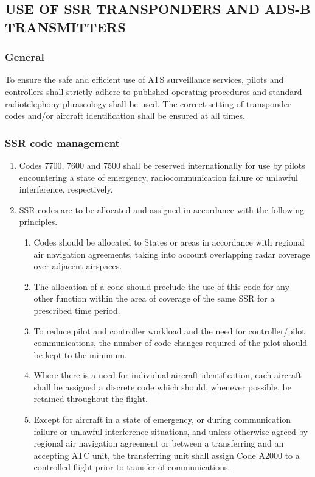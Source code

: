 \subsection[Use of SSR transponders and ADS-B transmitters]{USE OF SSR TRANSPONDERS AND ADS-B TRANSMITTERS}

\subsubsection{General}

To ensure the safe and efficient use of ATS surveillance services, pilots and controllers shall strictly adhere to published operating procedures and standard radiotelephony phraseology shall be used. The correct setting of transponder codes and/or aircraft identification shall be ensured at all times.

\subsubsection{SSR code management}

\begin{enumerate}
    \item Codes 7700, 7600 and 7500 shall be reserved internationally for use by pilots encountering a state of emergency, radiocommunication failure or unlawful interference, respectively.
    \item SSR codes are to be allocated and assigned in accordance with the following principles.
    
    \begin{enumerate}
        \item Codes should be allocated to States or areas in accordance with regional air navigation agreements, taking into account overlapping radar coverage over adjacent airspaces.
        \item The allocation of a code should preclude the use of this code for any other function within the area of coverage of the same SSR for a prescribed time period.
        \item To reduce pilot and controller workload and the need for controller/pilot communications, the number of code changes required of the pilot should be kept to the minimum.
        \item Where there is a need for individual aircraft identification, each aircraft shall be assigned a discrete code which should, whenever possible, be retained throughout the flight.
        \item Except for aircraft in a state of emergency, or during communication failure or unlawful interference situations, and unless otherwise agreed by regional air navigation agreement or between a transferring and an accepting ATC unit, the transferring unit shall assign Code A2000 to a controlled flight prior to transfer of communications.
    \end{enumerate}

\end{enumerate}

